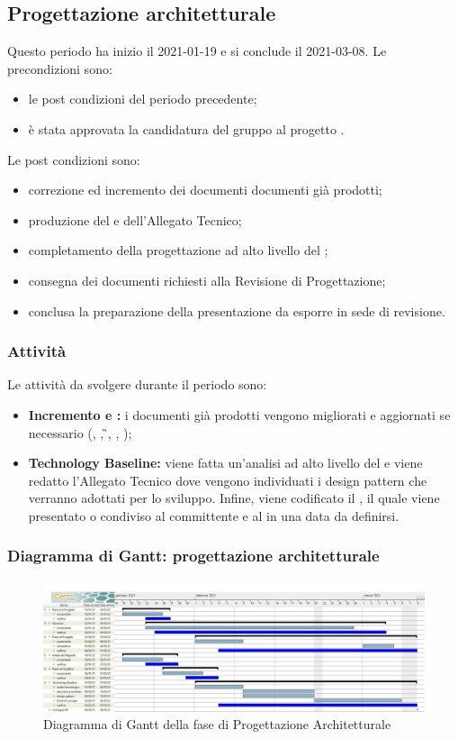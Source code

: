 \newpage
\subsection{Progettazione architetturale}
Questo periodo ha inizio il 2021-01-19 e si conclude il 2021-03-08.
Le precondizioni sono:
\begin{itemize}
	\item le post condizioni del periodo precedente;
	\item è stata approvata la candidatura del gruppo al progetto \NomeProgetto.
\end{itemize}
Le post condizioni sono:
\begin{itemize}
	\item correzione ed incremento dei documenti documenti già prodotti;
	\item produzione del \textit{} e dell'Allegato Tecnico;
	\item completamento della progettazione ad alto livello del ;
	\item consegna dei documenti richiesti alla Revisione di Progettazione; 	
	\item conclusa la preparazione della presentazione da esporre in sede di revisione.
\end{itemize}
\subsubsection{Attività}
Le attività da svolgere durante il periodo sono:
\begin{itemize}
	\item \textbf{Incremento e :} i documenti già prodotti vengono migliorati e aggiornati se necessario (\NdP{}, \PdP{}, \G{}, \PdQ{}, \AdR{});
	\item \textbf{Technology Baseline:} viene fatta un'analisi ad alto livello del  e viene redatto l'Allegato Tecnico dove vengono individuati i design pattern che verranno adottati per lo sviluppo. Infine, viene codificato il \textit{}, il quale viene presentato o condiviso al committente e al  in una data da definirsi.
\end{itemize}
\subsubsection{Diagramma di Gantt: progettazione architetturale}
\begin{figure}[H]
    \centering
    \includegraphics[scale = 0.25]{components/img/progettazione_architetturale.jpg}
    \caption{Diagramma di Gantt della fase di Progettazione Architetturale}
    \label{fig:\glo{Diagramma di Gantt}, fase di Progettazione Architetturale}
\end{figure}

